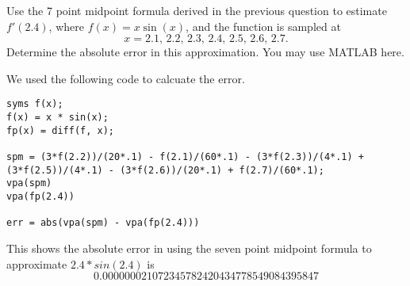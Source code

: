 \documentclass[12 pt, letterpaper]{exam}
\theoremstyle{definition}
\begin{document}
\begin{questions}
\question[30] Use the 7 point midpoint formula derived in the previous question to estimate $f'(2.4)$, where $f(x) = x\sin(x)$, and the function is sampled at $$x=2.1,\,2.2,\,2.3, \,2.4, \,2.5, \,2.6, \,2.7.$$  Determine the absolute error in this approximation.  You may use MATLAB here.
\begin{solution}
We used the following code to calcuate the error.
\begin{lstlisting}
syms f(x);
f(x) = x * sin(x);
fp(x) = diff(f, x);

spm = (3*f(2.2))/(20*.1) - f(2.1)/(60*.1) - (3*f(2.3))/(4*.1) + (3*f(2.5))/(4*.1) - (3*f(2.6))/(20*.1) + f(2.7)/(60*.1);
vpa(spm)
vpa(fp(2.4))

err = abs(vpa(spm) - vpa(fp(2.4)))    
\end{lstlisting}
This shows the absolute error in using the seven point midpoint formula to approximate $2.4 * sin(2.4)$ is 
$$ 0.000000021072345782420434778549084395847 $$
\end{solution}
\end{questions}
\end{document}
